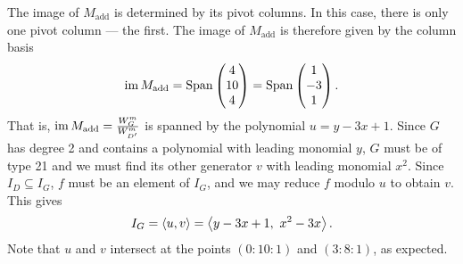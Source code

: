 The image of $M_{\text{add}}$ is determined by its pivot columns.
In this case, there is only one pivot column --- the first.
The image of $M_{\text{add}}$ is therefore given by the column basis
\[ \operatorname{im} M_{\text{add}} = \operatorname{Span} \begin{pmatrix} 4 \\ 10 \\ 4 \end{pmatrix}
         = \operatorname{Span} \begin{pmatrix} 1 \\ -3 \\ 1 \end{pmatrix}. \]
That is, $\operatorname{im} M_{\text{add}} = \frac {W_G^m}{W_{D'}^m}$ is spanned by the polynomial $u = y - 3x + 1$.
Since $G$ has degree 2 and contains a polynomial with leading monomial $y$,
$G$ must be of type 21 and we must find its other generator $v$ with leading monomial $x^2$.
Since $I_D \subseteq I_G$, $f$ must be an element of $I_G$, and we may reduce $f$ modulo $u$ to obtain $v$.
This gives
  \[ I_G = \left\langle u,v \right\rangle = \left\langle y - 3x + 1, ~x^2 - 3x \right\rangle. \]
Note that $u$ and $v$ intersect at the points $(0 : 10 : 1)$ and $(3 : 8 : 1)$, as expected.
